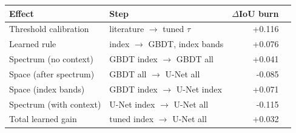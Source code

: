 \begin{tabular}{@{}llrr@{}}
\toprule
Effect & Step & $\Delta$IoU burn \\
\midrule
Threshold calibration & literature $\to$ tuned $\tau$ & +0.116 \\
Learned rule & index $\to$ GBDT, index bands & +0.076 \\
Spectrum (no context) & GBDT index $\to$ GBDT all & +0.041 \\
Space (after spectrum) & GBDT all $\to$ U-Net all & -0.085 \\
Space (index bands) & GBDT index $\to$ U-Net index & +0.071 \\
Spectrum (with context) & U-Net index $\to$ U-Net all & -0.115 \\
\midrule
Total learned gain & tuned index $\to$ U-Net all & +0.032 \\
\bottomrule
\end{tabular}